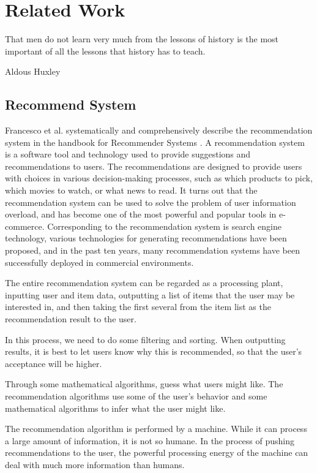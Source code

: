 \section{Related Work}
\label{ch:related-work}

\epigraph{That men do not learn very much from the lessons of history is the most important of all the lessons that history has to teach.}{Aldous Huxley}

\subsection{Recommend System}
Francesco et al. systematically and comprehensively describe the recommendation system in the handbook for Recommender Systems \cite{ricci2011introduction}. A recommendation system is a software tool and technology used to provide suggestions and recommendations to users. The recommendations are designed to provide users with choices in various decision-making processes, such as which products to pick, which movies to watch, or what news to read. It turns out that the recommendation system can be used to solve the problem of user information overload, and has become one of the most powerful and popular tools in e-commerce. Corresponding to the recommendation system is search engine technology, various technologies for generating recommendations have been proposed, and in the past ten years, many recommendation systems have been successfully deployed in commercial environments.
\par The entire recommendation system can be regarded as a processing plant, inputting user and item data, outputting a list of items that the user may be interested in, and then taking the first several from the item list as the recommendation result to the user.
\par In this process, we need to do some filtering and sorting. When outputting results, it is best to let users know why this is recommended, so that the user's acceptance will be higher.
\par Through some mathematical algorithms, guess what users might like. The recommendation algorithms use some of the user's behavior and some mathematical algorithms to infer what the user might like.
\par The recommendation algorithm is performed by a machine. While it can process a large amount of information, it is not so humane. In the process of pushing recommendations to the user, the powerful processing energy of the machine can deal with much more information than humans.


